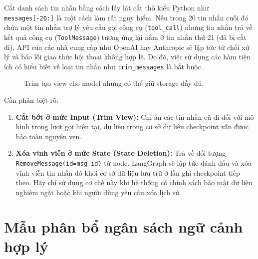 Cắt danh sách tin nhắn bằng cách lấy lát cắt thô kiểu Python như \texttt{messages[-20:]} là một cách làm rất nguy hiểm. Nếu trong 20 tin nhắn cuối đó chứa một tin nhắn trợ lý yêu cầu gọi công cụ (\texttt{tool\_call}) nhưng tin nhắn trả về kết quả công cụ (\texttt{ToolMessage}) tương ứng lại nằm ở tin nhắn thứ 21 (đã bị cắt đi), API của các nhà cung cấp như OpenAI hay Anthropic sẽ lập tức từ chối xử lý và báo lỗi giao thức hội thoại không hợp lệ. Do đó, việc sử dụng các hàm tiện ích có hiểu biết về loại tin nhắn như \texttt{trim\_messages} là bắt buộc.

\begin{figure}[H]
\centering
{}
\caption{Trim tạo view cho model nhưng có thể giữ storage đầy đủ.}
\label{fig:trim-view}
\end{figure}

\begin{aiwarning}
Cần phân biệt rõ:
\begin{enumerate}
  \item \textbf{Cắt bớt ở mức Input (Trim View):} Chỉ ẩn các tin nhắn cũ đi đối với mô hình trong lượt gọi hiện tại, dữ liệu trong cơ sở dữ liệu checkpoint vẫn được bảo toàn nguyên vẹn.
  \item \textbf{Xóa vĩnh viễn ở mức State (State Deletion):} Trả về đối tượng \texttt{RemoveMessage(id=msg\_id)} từ node. LangGraph sẽ lập tức đánh dấu và xóa vĩnh viễn tin nhắn đó khỏi cơ sở dữ liệu lưu trữ ở lần ghi checkpoint tiếp theo. Hãy chỉ sử dụng cơ chế này khi hệ thống có chính sách bảo mật dữ liệu nghiêm ngặt hoặc khi người dùng yêu cầu xóa lịch sử.
\end{enumerate}
\end{aiwarning}

\section{Mẫu phân bổ ngân sách ngữ cảnh hợp lý}


